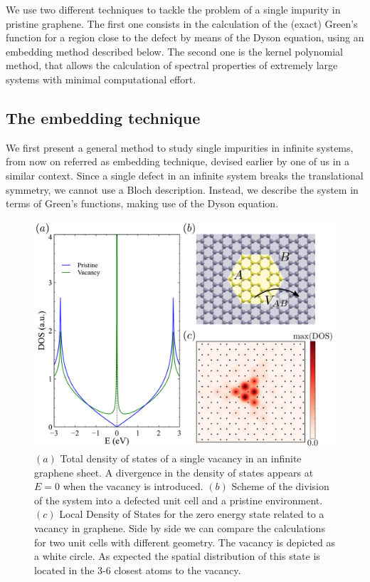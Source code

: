 We use two different techniques to tackle the problem of a single impurity in
pristine graphene. The first one consists in the calculation of the (exact)
Green's function for a region close to the defect by means of the Dyson
equation, using an embedding method described below.
The second one is the kernel polynomial method, that allows the calculation of spectral properties of extremely large systems with minimal computational effort.


\subsection{The embedding technique}
We first present a general method to study single impurities in infinite systems, from now on referred as embedding technique, devised earlier by one of us in a similar context.\cite{Jacob2010orbital}
Since a single defect in an infinite system breaks the translational symmetry, we cannot use a Bloch description. Instead, we describe the system in terms of Green's functions, making use of the Dyson equation.
\begin{figure}[t!]
\centering\includegraphics{defects/fig/DOSlDOS.pdf}
\caption{$(a)$ Total density of states of a single vacancy in an infinite graphene sheet. A divergence in the density of states appears at $E=0$ when the vacancy is introduced. $(b)$ Scheme of the division of the system into a defected unit cell and a pristine environment. $(c)$ Local Density of States for the zero energy state related to a vacancy in graphene. Side by side we can compare the calculations for two unit cells with different geometry. The vacancy is depicted as a white circle. As expected the spatial distribution of this state is located in the 3-6 closest atoms to the vacancy.}
\label{regions}
\label{DOS}
\vspace{-5pt}
\end{figure}
